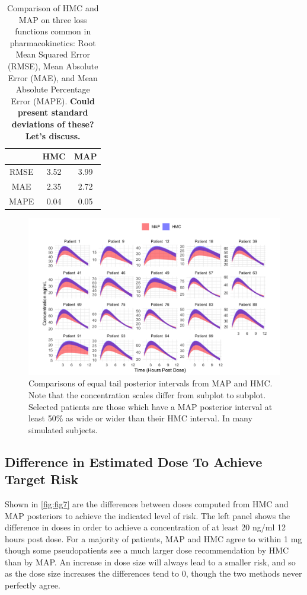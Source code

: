 \begin{table}
	\centering
\begin{tabular}{|c|c|c|}
	\hline 
	& HMC & MAP \\ 
	\hline 
	RMSE & 3.52 & 3.99 \\ 
	\hline 
	MAE & 2.35 & 2.72 \\ 
	\hline 
	MAPE & 0.04 & 0.05 \\ 
	\hline 
\end{tabular} 
\caption{Comparison of HMC and MAP on three loss functions common in pharmacokinetics: Root Mean Squared Error (RMSE), Mean Absolute Error (MAE), and Mean Absolute Percentage Error (MAPE). \textbf{Could present standard deviations of these? Let's discuss.}}
\end{table}

\begin{figure}
	\centering
	\includegraphics[width=1\linewidth]{figs/intervals}
	\caption{Comparisons of equal tail posterior intervals from MAP and HMC. Note that the concentration scales differ from subplot to subplot.  Selected patients are those which have a MAP posterior interval at least 50\% as wide or wider than their HMC interval.  In many simulated subjects.}
	\label{fig:fig6}
\end{figure}


\subsection*{Difference in Estimated Dose To Achieve Target Risk}


Shown in \cref{fig:fig7} are the differences between doses computed from HMC and MAP posteriors to achieve the indicated level of risk.  The left panel shows the difference in doses in order to achieve a concentration of at least 20 ng/ml 12 hours post dose. For a majority of patients, MAP and HMC agree to within 1 mg though some pseudopatients see a much larger dose recommendation by HMC than by MAP.  An increase in dose size will always lead to a smaller risk, and so as the dose size increases the differences tend to 0, though the two methods never perfectly agree.

